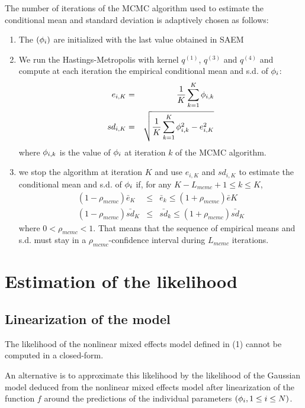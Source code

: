 The number of iterations of the MCMC algorithm used to estimate the
conditional mean and standard deviation is adaptively chosen as
follows:
\begin{enumerate}
  \item The $({\phi}_i)$ are initialized with the last value obtained in SAEM
  \item We run the Hastings-Metropolis with kernel $q^{(1)}$, $q^{(3)}$ and $q^{(4)}$ and compute at each iteration the empirical conditional mean
  and s.d. of ${\phi}_i$:
  \begin{eqnarray}
  e_{i,K} &= &\frac{1}{K}\sum_{k=1}^K {\phi}_{i,k} \\
  sd_{i,K} &= &\sqrt{\frac{1}{K}\sum_{k=1}^K {\phi}_{i,k}^2 - e_{i,K}^2 }
  \end{eqnarray}
  where ${\phi}_{i,k}$ is the value of ${\phi}_i$ at iteration $k$ of the MCMC algorithm.
  \item we stop the algorithm at iteration $K$ and use $e_{i,K}$ and $sd_{i,K}$ to estimate the conditional mean and s.d. of ${\phi}_i$ if, for
  any $ K-L_{mcmc}+1 \leq k \leq K$,
  \begin{eqnarray}
  \label{Lmcmc}  (1-\rho_{mcmc})\bar{e}_K & \leq & \bar{e}_k \leq  (1+\rho_{mcmc})\bar{e}{K} \\
  \nonumber  (1-\rho_{mcmc})\bar{sd}_{K} & \leq & \bar{sd}_{k} \leq  (1+\rho_{mcmc})\bar{sd}_{K}
  \end{eqnarray}
where $0<\rho_{mcmc}<1$. That means that the sequence of empirical means and s.d. must stay in a $\rho_{mcmc}$-confidence interval during $L_{mcmc}$
iterations.
\end{enumerate}

\section{Estimation of the likelihood} \label{estilik}
\subsection{Linearization of the model}
The likelihood of the nonlinear mixed effects model defined in (1) cannot be computed in a closed-form.

An alternative is  to approximate this likelihood  by the likelihood of the Gaussian model deduced from the nonlinear mixed
effects model after linearization of the function $f$ around
the predictions of the individual parameters $({{\phi}_i}, 1\leq i \leq N) $.

